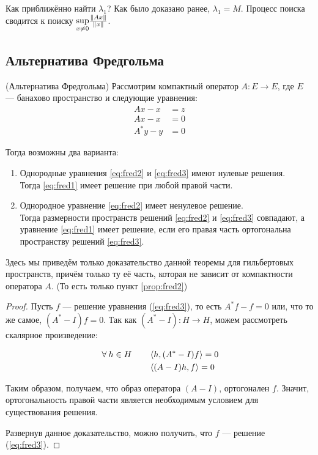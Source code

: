 \documentclass[12pt]{article}
\begin{document}
	Как приближённо найти $\lambda_1$? Как было доказано ранее, $\lambda_1 = M$. Процесс поиска сводится к поиску 
	$\underset{x\neq0}{\sup}{\frac{\left\| Ax \right\|}{\left\| x \right\|}}$.
	
	\subsection{Альтернатива Фредгольма}
	
	\begin{theorem}
		(Альтернатива Фредгольма) Рассмотрим компактный оператор $A: E\rightarrow E$, где $E$ --- банахово 
		пространство и следующие уравнения:
		\begin{align}
			Ax - x &= z   \tag{но} \label{eq:fred1} \\
			Ax - x &= 0   \tag{о} \label{eq:fred2} \\
			A^*y - y &= 0 \tag{со} \label{eq:fred3}
		\end{align}
		
		Тогда возможны два варианта:
		\begin{enumerate}
			\item Однородные уравнения \ref{eq:fred2} и \ref{eq:fred3} имеют нулевые решения. \label{prop:fred1}\\
			Тогда \ref{eq:fred1} имеет решение при любой правой части.
			
			\item Однородное уравнение \ref{eq:fred2} имеет ненулевое решение. \label{prop:fred2}\\
			Тогда размерности пространств решений \ref{eq:fred2} и \ref{eq:fred3} совпадают,
			а уравнение \ref{eq:fred1} имеет решение, если его правая часть ортогональна 
			пространству решений \ref{eq:fred3}.
		\end{enumerate}
	\end{theorem}
	Здесь мы приведём только доказательство данной теоремы для гильбертовых пространств, причём только ту её 
	часть, которая не зависит от компактности оператора $A$. (То есть только пункт \ref{prop:fred2})
	\begin{proof}
		Пусть $f$ --- решение уравнения (\ref{eq:fred3}), то есть $A^*f - f = 0$ или, что то же самое, 
		$(A^* - I)f = 0$. Так как $(A^* - I): H \rightarrow H$, можем рассмотреть скалярное произведение:
		
		\begin{align*}
			\forall h \in H \qquad &\scal{h}{(A^*-I)f} = 0 \\
			                       &\scal{(A-I)h}{f} = 0
		\end{align*}
		
		Таким образом, получаем, что образ оператора $(A-I)$, ортогонален $f$. Значит, ортогональность 
		правой части является необходимым условием для существования решения.
		
		Развернув данное доказательство, можно получить, что $f$ --- решение (\ref{eq:fred3}).
	\end{proof}
	
\end{document}
